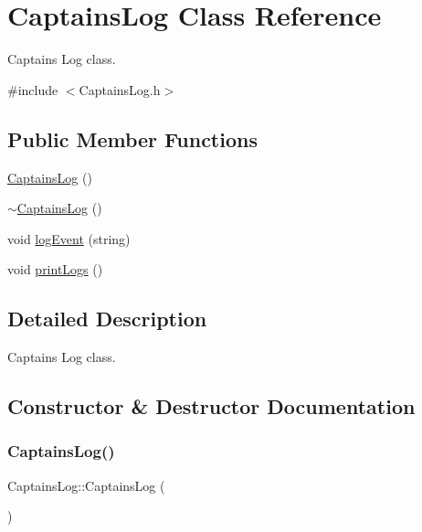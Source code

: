 \hypertarget{classCaptainsLog}{}\section{Captains\+Log Class Reference}
\label{classCaptainsLog}


Captains Log class.  




{\ttfamily \#include $<$Captains\+Log.\+h$>$}

\subsection*{Public Member Functions}
\begin{DoxyCompactItemize}
\item 
\hyperlink{classCaptainsLog_a79872d886041ecbd5fb13c47fbda825b}{Captains\+Log} ()
\item 
\hyperlink{classCaptainsLog_ad226cf893a8e2498d164be4f6f097231}{$\sim$\+Captains\+Log} ()
\item 
void \hyperlink{classCaptainsLog_a59214274a2c25268a26e2af84fe50bc0}{log\+Event} (string)
\item 
void \hyperlink{classCaptainsLog_a7a534bb9e892210686b76c15b30fab95}{print\+Logs} ()
\end{DoxyCompactItemize}


\subsection{Detailed Description}
Captains Log class. 

\subsection{Constructor \& Destructor Documentation}
\mbox{\label{classCaptainsLog_a79872d886041ecbd5fb13c47fbda825b}} 
\subsubsection{\texorpdfstring{Captains\+Log()}{CaptainsLog()}}
{\footnotesize\ttfamily Captains\+Log\+::\+Captains\+Log (\begin{DoxyParamCaption}{ }\end{DoxyParamCaption})}

